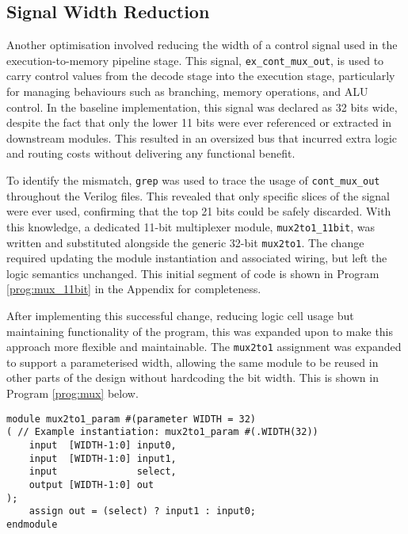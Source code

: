 \documentclass[a4paper,10pt]{article}
\begin{document}
\subsection{Signal Width Reduction}
\label{sec:Signal_Width}

Another optimisation involved reducing the width of a control signal used in 
the execution-to-memory pipeline stage. 
This signal, \texttt{ex\_cont\_mux\_out}, 
is used to carry control values from the decode 
stage into the execution stage, 
particularly for managing behaviours such as branching, memory operations, and ALU control. 
In the baseline implementation, this signal was declared as 32 bits wide, 
despite the fact that only the lower 11 bits 
were ever referenced or extracted in downstream modules. 
This resulted in an oversized bus that incurred extra logic and routing 
costs without delivering any functional benefit.

To identify the mismatch, \texttt{grep} was used to trace the usage of 
\texttt{cont\_mux\_out} throughout the Verilog files. 
This revealed that only specific slices of the signal were ever used, 
confirming that the top 21 bits could be safely discarded. 
With this knowledge, a dedicated 11-bit multiplexer module, 
\texttt{mux2to1\_11bit}, was written and substituted alongside the 
generic 32-bit \texttt{mux2to1}. 
The change required updating the 
module instantiation and associated wiring, 
but left the logic semantics unchanged.
This initial segment of code is shown in Program \ref{prog:mux_11bit}
in the Appendix for completeness.

After implementing this successful change, 
reducing logic cell usage but maintaining functionality of the program,
this was expanded upon to make this approach more flexible and maintainable.
The \texttt{mux2to1} assignment was expanded to support a parameterised width, 
allowing the same module to be reused in other parts of the design 
without hardcoding the bit width. 
This is shown in Program \ref{prog:mux} below.

\begin{lstlisting}[style=verilog-style, caption=
    {Generic width multiplexer}, label={prog:mux}]
module mux2to1_param #(parameter WIDTH = 32)
( // Example instantiation: mux2to1_param #(.WIDTH(32))
    input  [WIDTH-1:0] input0,
    input  [WIDTH-1:0] input1,
    input              select,
    output [WIDTH-1:0] out
);
    assign out = (select) ? input1 : input0;
endmodule
\end{lstlisting}
\end{document}
